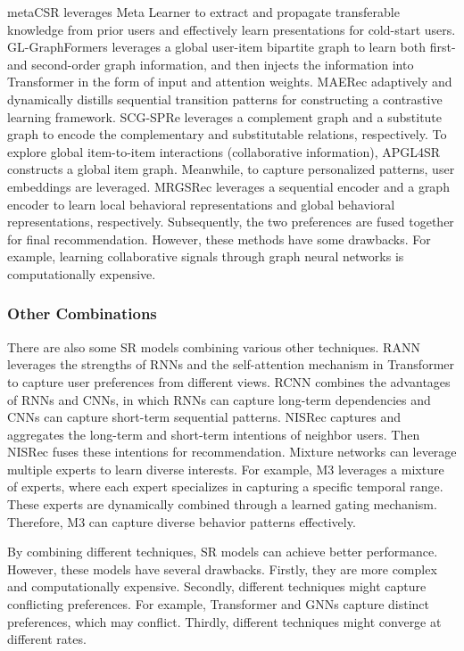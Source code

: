 \documentclass[review]{fcs}
\begin{document}
	metaCSR \cite{metaCSR} leverages Meta Learner to extract and propagate transferable knowledge from prior users and effectively learn presentations for cold-start users. GL-GraphFormers \cite{GL-GraphFormers} leverages a global user-item bipartite graph to learn both first- and second-order graph information, and then injects the information into Transformer in the form of input and attention weights. MAERec \cite{MAERec} adaptively and dynamically distills sequential transition patterns for constructing a contrastive learning framework. SCG-SPRe \cite{SCR-SPRe} leverages a complement graph and a substitute graph to encode the complementary and substitutable relations, respectively. To explore global item-to-item interactions (collaborative information), APGL4SR \cite{APGL4SR} constructs a global item graph. Meanwhile, to capture personalized patterns, user embeddings are leveraged. MRGSRec \cite{MRGSRec} leverages a sequential encoder and a graph encoder to learn local behavioral representations and global behavioral representations, respectively. Subsequently, the two preferences are fused together for final recommendation. However, these methods have some drawbacks. For example, learning collaborative signals through graph neural networks is computationally expensive.
	\subsubsection{Other Combinations}
	There are also some SR models combining various other techniques. RANN \cite{RANN} leverages the strengths of RNNs and the self-attention mechanism in Transformer to capture user preferences from different views. RCNN \cite{RCNN} combines the advantages of RNNs and CNNs, in which RNNs can capture long-term dependencies and CNNs can capture short-term sequential patterns. NISRec \cite{NISRec} captures and aggregates the long-term and short-term intentions of neighbor users. Then NISRec \cite{NISRec} fuses these intentions for recommendation. Mixture networks can leverage multiple experts to learn diverse interests. For example, M3 \cite{M3} leverages a mixture of experts, where each expert specializes in capturing a specific temporal range. These experts are dynamically combined through a learned gating mechanism. Therefore, M3 \cite{M3} can capture diverse behavior patterns effectively.
	
	By combining different techniques, SR models can achieve better performance. However, these models have several drawbacks. Firstly, they are more complex and computationally expensive. Secondly, different techniques might capture conflicting preferences. For example, Transformer and GNNs capture distinct preferences, which may conflict. Thirdly, different techniques might converge at different rates.
\end{document}
